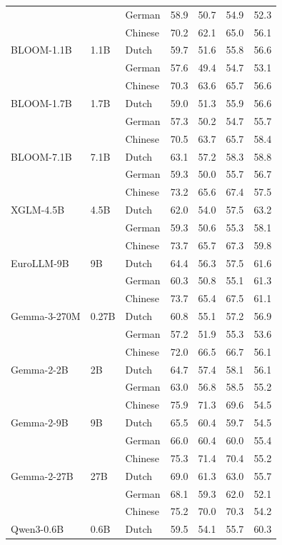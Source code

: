 \begin{table}[t]
\begin{tabular}{lll cccc}
 &  & German & 58.9 & 50.7 & 54.9 & 52.3 \\
 &  & Chinese & 70.2 & 62.1 & 65.0 & 56.1 \\
BLOOM-1.1B & 1.1B & Dutch & 59.7 & 51.6 & 55.8 & 56.6 \\
 &  & German & 57.6 & 49.4 & 54.7 & 53.1 \\
 &  & Chinese & 70.3 & 63.6 & 65.7 & 56.6 \\
BLOOM-1.7B & 1.7B & Dutch & 59.0 & 51.3 & 55.9 & 56.6 \\
 &  & German & 57.3 & 50.2 & 54.7 & 55.7 \\
 &  & Chinese & 70.5 & 63.7 & 65.7 & 58.4 \\
BLOOM-7.1B & 7.1B & Dutch & 63.1 & 57.2 & 58.3 & 58.8 \\
 &  & German & 59.3 & 50.0 & 55.7 & 56.7 \\
 &  & Chinese & 73.2 & 65.6 & 67.4 & 57.5 \\
XGLM-4.5B & 4.5B & Dutch & 62.0 & 54.0 & 57.5 & 63.2 \\
 &  & German & 59.3 & 50.6 & 55.3 & 58.1 \\
 &  & Chinese & 73.7 & 65.7 & 67.3 & 59.8 \\
EuroLLM-9B & 9B & Dutch & 64.4 & 56.3 & 57.5 & 61.6 \\
 &  & German & 60.3 & 50.8 & 55.1 & 61.3 \\
 &  & Chinese & 73.7 & 65.4 & 67.5 & 61.1 \\
Gemma-3-270M & 0.27B & Dutch & 60.8 & 55.1 & 57.2 & 56.9 \\
 &  & German & 57.2 & 51.9 & 55.3 & 53.6 \\
 &  & Chinese & 72.0 & 66.5 & 66.7 & 56.1 \\
Gemma-2-2B & 2B & Dutch & 64.7 & 57.4 & 58.1 & 56.1 \\
 &  & German & 63.0 & 56.8 & 58.5 & 55.2 \\
 &  & Chinese & 75.9 & 71.3 & 69.6 & 54.5 \\
Gemma-2-9B & 9B & Dutch & 65.5 & 60.4 & 59.7 & 54.5 \\
 &  & German & 66.0 & 60.4 & 60.0 & 55.4 \\
 &  & Chinese & 75.3 & 71.4 & 70.4 & 55.2 \\
Gemma-2-27B & 27B & Dutch & 69.0 & 61.3 & 63.0 & 55.7 \\
 &  & German & 68.1 & 59.3 & 62.0 & 52.1 \\
 &  & Chinese & 75.2 & 70.0 & 70.3 & 54.2 \\
Qwen3-0.6B & 0.6B & Dutch & 59.5 & 54.1 & 55.7 & 60.3 \\

\end{tabular}
\end{table}
